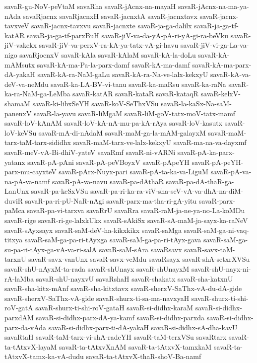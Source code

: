 {savaR-gu-NoV-peVtaM
savaRha
savaR-jAcnx-na-mayaH
savaR-jAcnx-na-ma-ya-nAda
savaRjacnx
savaRjacnxH
savaR-jacnxtA
savaR-jacnxtavx
savaR-jacnx-tavxveV
savaR-jacnx-tavxvu
savaR-jacnxte
savaR-ja-ga-dalilx
savaR-ja-ga-tf-katAR
savaR-ja-ga-tf-parxBuH
savaR-jiV-va-da-yA-pA-ri-yA-gi-ra-beVku
savaR-jiV-vakekx
savaR-jiV-va-perxV-ra-kA-ya-tatx-vA-gi-havu
savaR-jiV-vi-ga-La-va-nigo
savaRjocnxV
savaR-kAla
savaR-kAlaM
savaR-kA-la-doLu
savaR-kA-mAMsutx
savaR-kA-ma-Pa-la-parx-damf
savaR-kA-ma-damf
savaR-kA-ma-parx-dA-yakaH
savaR-kA-ra-NaM-gaLu
savaR-kA-ra-Na-ve-lalx-kekxyU
savaR-kA-va-deV-va-neMdu
savaR-ka-LA-BV-vi-tanu
savaR-ka-maRsu
savaR-ka-raNa
savaR-ka-ra-NaM-ga-LeMba
savaR-katAR
savaR-kataR
savaR-kataqR
savaR-kelxV-shamaM
savaR-ki-libxSeYH
savaR-koV-SeThxVSu
savaR-la-kaSx-Na-saM-panenxV
savaR-la-yavu
savaR-liMgaM
savaR-liM-goV-tatx-moV-tatx-mamf
savaR-loV-kAnAM
savaR-loV-kA-nA-mu-pa-kA-rAya
savaR-loV-kasutx
savaR-loV-keVSu
savaR-mA-di-nAdaM
savaR-maM-ga-la-mAM-galayxM
savaR-maM-tarx-taM-tarx-sididhx
savaR-maM-tarx-ve-lalx-kekxyU
savaR-ma-na-va-dayxmf
savaR-meV-vA-Bi-dhiV-yateV
savaRmf
savaR-ni-vARNi
savaR-pA-ka-parx-yatanx
savaR-pA-pAni
savaR-pA-peVBoyxV
savaR-pApeYH
savaR-pA-peYH-parx-mu-cayxteV
savaR-pArx-Nuyx-pari
savaR-pA-ta-ka-va-LiguM
savaR-pA-va-na-pA-va-namf
savaR-pA-va-navu
savaR-pa-dAthaR
savaR-pa-dA-thaR-ga-LanUnx
savaR-pa-keSxVSu
savaR-pa-ri-ka-ra-viV-sha-seV-vA-va-dhA-na-diM-duviR
savaR-pa-ri-pU-NaR-nAgi
savaR-parx-ma-tha-ri-gA-yitu
savaR-parx-paMca
savaR-pa-vi-tarxva
savaRrU
savaRra
savaR-raM-ja-ne-ya-no-La-koMDu
savaR-rige
savaR-ri-ge-lalxkUkx
savaR-sAkiSx
savaR-sA-maM-ja-sayx-ka-raNeV
savaR-sAyxsayx
savaR-saM-deV-ha-kikxkikx
savaR-saMga
savaR-saM-ga-ni-vaq-titxya
savaR-saM-ga-pa-ri-tAyxga
savaR-saM-ga-pa-ri-tAyx-gava
savaR-saM-ga-su-pa-ri-tAyx-ga-vA-va-ri-salA
savaR-saM-sAra
savaRsavx
savaR-savx-taM-tarxnU
savaR-savx-vanUnx
savaR-savx-veMdu
savaRsayx
savaR-shA-setxrXVSu
savaR-shU-nAyxM-ta-rada
savaR-shUnayx
savaR-shUnayxM
savaR-shU-nayx-ni-rA-laMba
savaR-shU-nayxvU
savaRshaH
savaR-shakatx
savaR-sha-katxnU
savaR-sha-kitx-mAnf
savaR-sha-kitxtavx
savaR-sherxV-SaThx-vA-du-dA-gide
savaR-sherxV-SaThx-vA-gide
savaR-shurx-ti-sa-ma-navxyaH
savaR-shurx-ti-shi-roV-gatA
savaR-shurx-ti-shi-roV-gataH
savaR-si-didhx-karaM
savaR-si-didhx-parxdAM
savaR-si-didhx-parx-dA-ya-kamf
savaR-si-didhx-parxda
savaR-si-didhx-parx-da-vAda
savaR-si-didhx-parx-ti-dA-yakaH
savaR-si-didhx-sA-dha-kavU
savaRtaH
savaR-taM-tarx-vi-shA-radeYH
savaR-taM-terxVSu
savaRtarx
savaR-ta-tAtxvX-layaM
savaR-ta-tAtxvXnAM
savaR-ta-tAtxvX-tamxkaM
savaR-ta-tAtxvX-tamx-ka-vA-dudu
savaR-ta-tAtxvX-thaR-shoV-Ba-namf
}

